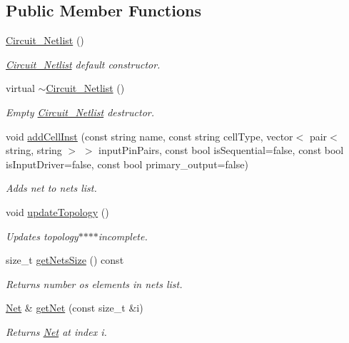 \subsection*{Public Member Functions}
\begin{DoxyCompactItemize}
\item 
\hyperlink{classCircuit__Netlist_aae9b9e9ea0db3af35377d67a6e4d3d98}{Circuit\-\_\-\-Netlist} ()
\begin{DoxyCompactList}\small\item\em \hyperlink{classCircuit__Netlist}{Circuit\-\_\-\-Netlist} default constructor. \end{DoxyCompactList}\item 
virtual \hyperlink{classCircuit__Netlist_a976bdf13baf79ba608b0c2eff6682efc}{$\sim$\-Circuit\-\_\-\-Netlist} ()
\begin{DoxyCompactList}\small\item\em Empty \hyperlink{classCircuit__Netlist}{Circuit\-\_\-\-Netlist} destructor. \end{DoxyCompactList}\item 
void \hyperlink{classCircuit__Netlist_a325723d10f874b1f37fae290929bb05e}{add\-Cell\-Inst} (const string name, const string cell\-Type, vector$<$ pair$<$ string, string $>$ $>$ input\-Pin\-Pairs, const bool is\-Sequential=false, const bool is\-Input\-Driver=false, const bool primary\-\_\-output=false)
\begin{DoxyCompactList}\small\item\em Adds net to nets list. \end{DoxyCompactList}\item 
void \hyperlink{classCircuit__Netlist_ac5ab8d692eb5d18bed59e41d2c55b678}{update\-Topology} ()
\begin{DoxyCompactList}\small\item\em Updates topology$\ast$$\ast$$\ast$$\ast$incomplete. \end{DoxyCompactList}\item 
size\-\_\-t \hyperlink{classCircuit__Netlist_a9bcee2cb05504ee65f3e70df9f89f576}{get\-Nets\-Size} () const 
\begin{DoxyCompactList}\small\item\em Returns number os elements in nets list. \end{DoxyCompactList}\item 
\hyperlink{structCircuit__Netlist_1_1Net}{Net} \& \hyperlink{classCircuit__Netlist_ad894dfb5dabad7c657c450d32adda23d}{get\-Net} (const size\-\_\-t \&i)
\begin{DoxyCompactList}\small\item\em Returns \hyperlink{structCircuit__Netlist_1_1Net}{Net} at index i. \end{DoxyCompactList}\item 

\end{DoxyCompactItemize}
